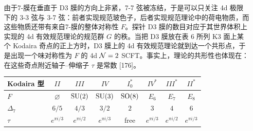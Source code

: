 
由于7-膜在垂直于 D3 膜的方向上非紧，7-7 弦被冻结，于是可以只关注 4d 极限下的 3-3 弦与 3-7 弦：前者实现规范玻色子，后者实现规范理论中的荷电物质，而这些物质还带有来自7-膜的整体对称性 $F$。探针 D3 膜的数目对应于其世界体积上实现的 4d 有效规范理论的规范群 $G$ 的秩。当把 D3 膜放在表 6 所列 K3 面上某个 Kodaira 奇点的正上方时，D3 膜上的 4d 有效规范理论就到达一个共形点，于是出现一个味对称性为 $F$ 的 4d $\mathcal{N}=2$ SCFT。事实上，理论的共形性也体现在：在这些奇点附近轴子--伸缩子 $\tau$ 是常数 [176]。

\begin{center}
\small
\begin{tabular}{lccccccc}
\toprule
Kodaira 型 & $II$ & $III$ & $IV$ & $I_0^*$ & $IV^*$ & $III^*$ & $II^*$ \\
\midrule
$F$ & $\varnothing$ & $\mathrm{SU}(2)$ & $\mathrm{SU}(3)$ & $\mathrm{SO}(8)$ & $E_6$ & $E_7$ & $E_8$ \\
$\Delta_7$ & $6/5$ & $4/3$ & $3/2$ & $2$ & $3$ & $4$ & $6$ \\
$\tau$ & $e^{\pi i/3}$ & $e^{\pi i/2}$ & $e^{\pi i/3}$ & free & $e^{\pi i/3}$ & $e^{\pi i/2}$ & $e^{\pi i/3}$ \\
\bottomrule
\end{tabular}
\end{center}


